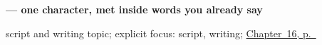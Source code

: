 \noindent\begin{minipage}[t]{\linewidth}
\raggedright
\textbf{ — one character, met inside words you already say}\par
\footnotesize script and writing topic; explicit focus: script, writing; \hyperref[ch:ka-traditional-months]{Chapter~16, p.~\pageref*{ch:ka-traditional-months}}
\end{minipage}\par\smallskip
